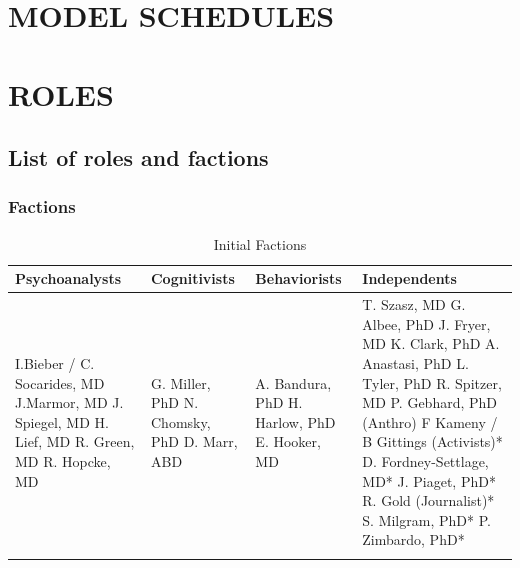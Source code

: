 \pagebreak 

\chapter{MODEL SCHEDULES}
\label{modelschedules}

\pagebreak 

\chapter{ROLES}
\label{roles}

\section{List of roles and factions}
\label{listofrolesandfactions}

\subsection{Factions}
\label{factions}

 \begin{longtable}[!t]{ | p{2cm} | p{2cm} | p{2cm} | p{2cm} | }
\hline
Psychoanalysts & Cognitivists & Behaviorists & Independents \\ \hline
I.Bieber / C. Socarides, MD \newline
J.Marmor, MD \newline
J. Spiegel, MD \newline
H. Lief, MD \newline
R. Green, MD \newline
R. Hopcke, MD &
G. Miller, PhD \newline
N. Chomsky, PhD \newline
D. Marr, ABD &
A. Bandura, PhD \newline
H. Harlow, PhD \newline
E. Hooker, MD \newline &
T. Szasz, MD\newline
G. Albee, PhD\newline
J. Fryer, MD\newline
K. Clark, PhD\newline
A. Anastasi, PhD\newline
L. Tyler, PhD\newline
R. Spitzer, MD\newline
P. Gebhard, PhD (Anthro)\newline
F Kameny / B Gittings (Activists)*\newline
D. Fordney-Settlage, MD*\newline
J. Piaget, PhD*\newline
R. Gold (Journalist)*\newline
S. Milgram, PhD*\newline
P. Zimbardo, PhD*\newline \\
\caption{Initial Factions}
\label{table: factions}
\end{longtable}


